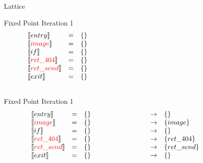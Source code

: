 \begin{frame}{Lattice}
  
\end{frame}


\begin{frame}{Fixed Point Iteration 1}
\[
\begin{array}{lclcl}
  \constraint{entry} & = & \{\} & &\\
  \assignconstraint{image} & = & \{\} &\\
  \constraint{if} & = & \{\}&\\
  \assignconstraint{ret\_404} & = & \{\}&\\
  \assignconstraint{ret\_send} & = & \{\}&\\
  \constraint{exit} & = & \{\}&\\
  && \phantom{\{command, paramssdd\}} && \phantom{\{command, param\}}
\end{array}
\]
\end{frame}

\begin{frame}{Fixed Point Iteration 1}
\[
\begin{array}{lclcl}
  \constraint{entry} & = & \{\} & \rightarrow & \{\}\\
  \assignconstraint{image} & = & \{\} & \rightarrow &\{image\}\\
  \constraint{if} & = & \{\} & \rightarrow &\{\}\\
  \assignconstraint{ret\_404} & = & \{\} & \rightarrow &\{ret\_404\}\\
  \assignconstraint{ret\_send} & = & \{\} & \rightarrow &\{ret\_send\}\\
  \constraint{exit} & = & \{\} & \rightarrow & \{\}\\
  && \phantom{\{command, param\}} && \phantom{\{command, param\}}
\end{array}
\]
\end{frame}

